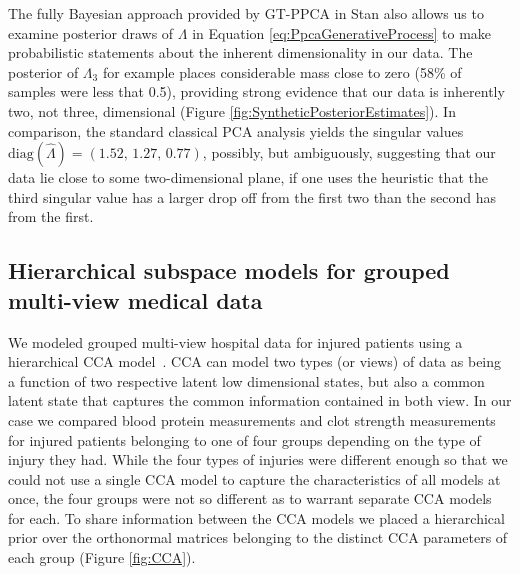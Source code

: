 \documentclass{article}
\begin{document}
The fully Bayesian approach provided by GT-PPCA in Stan also allows us to examine posterior draws of $\Lambda$ in Equation \ref{eq:PpcaGenerativeProcess} to make probabilistic statements about the inherent dimensionality in our data. The posterior of $\Lambda_3$ for example places considerable mass close to zero (58\% of samples were less that 0.5), providing strong evidence that our data is inherently two, not three, dimensional (Figure \ref{fig:SyntheticPosteriorEstimates}). In comparison, the standard classical PCA analysis yields the singular values $\mathrm{diag}(\hat{\Lambda}) = (1.52,\, 1.27,\, 0.77)$, possibly, but ambiguously, suggesting that our data lie close to some two-dimensional plane, if one uses the heuristic that the third singular value has a larger drop off from the first two than the second has from the first.

\subsection{Hierarchical subspace models for grouped multi-view medical data}
We modeled grouped multi-view hospital data for injured patients using a hierarchical CCA model~\citep[chapt.~15.2]{murphy2012machine}. CCA can model two types (or views) of data as being a function of two respective latent low dimensional states, but also a common latent state that captures the common information contained in both view. In our case we compared blood protein measurements and clot strength measurements for injured patients belonging to one of four groups depending on the type of injury they had. While the four types of injuries were different enough so that we could not use a single CCA model to capture the characteristics of all models at once, the four groups were not so different as to warrant separate CCA models for each. To share information between the CCA models we placed a hierarchical prior over the orthonormal matrices belonging to the distinct CCA parameters of each group (Figure \ref{fig:CCA}).
\end{document}

